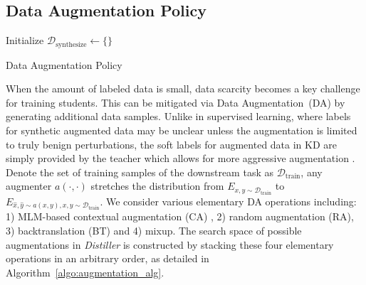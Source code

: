 \documentclass[11pt]{article}
\begin{document}
\subsection{Data Augmentation Policy}
\label{subsec:DA}
\begin{algorithm}[tb!]
\scriptsize
  \BlankLine
  Initialize $\mathcal{D}_\text{synthesize} \leftarrow \{\}$ \\
  \caption{Data Augmentation Policy}
  \label{algo:augmentation_alg}
\end{algorithm}
When the amount of labeled data is small, data scarcity becomes a key challenge for training students.
This can be mitigated via Data Augmentation~(DA) by generating additional data samples. Unlike in supervised learning, where labels for synthetic augmented data may be unclear unless the augmentation is limited to truly benign perturbations, the soft labels for augmented data in KD are simply provided by the teacher which allows for more aggressive augmentation \citep{fakoor2020fast}. 
Denote the set of training samples of the downstream task as $\mathcal{D}_{\text{train}}$, any augmenter $a(\cdot, \cdot)$ stretches the distribution from $E_{x,y\sim {\mathcal{D}_{\text{train}}}}$ to $E_{\hat{x},\hat{y}\sim {a(x,y)},x,y\sim {\mathcal{D}_{\text{train}}}}$. We consider various elementary DA operations including: 1) MLM-based contextual augmentation (CA) , 2) random augmentation (RA), 3) backtranslation (BT) and 4) mixup. The search space of possible augmentations in \emph{Distiller} is constructed by stacking these four elementary operations in an arbitrary order, as detailed in Algorithm~\ref{algo:augmentation_alg}.
\end{document}
